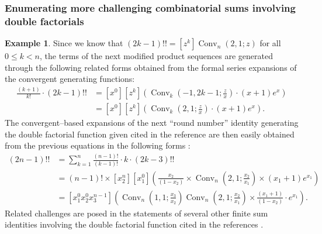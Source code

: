 \documentclass[12pt,reqno]{article}
\numberwithin{sfootnote}{section}
\numberwithin{equation}{section}
\theoremstyle{plain}
\theoremstyle{definition}
\newtheorem{example}[theorem]{Example}
\theoremstyle{remark}
\newcommand{\quotetext}[1]{``#1''}
\newcommand{\ConvGF}[4]{\ensuremath{\Conv_{#1}\left(#2, #3; #4\right)}}
\DeclareMathOperator{\Conv}{Conv}
\begin{document}
\subsubsection{Enumerating more challenging combinatorial sums involving 
               double factorials} 

\begin{example} 
\label{example_SumsInvolving_DblFactFns-exps_examples_v1} 
Since we know that $(2k-1)!! = [z^k] \ConvGF{n}{2}{1}{z}$ 
for all $0 \leq k < n$, the terms of the next 
modified product sequences are generated through the 
following related forms obtained from the formal series 
expansions of the convergent generating functions: 
\begin{align*} 
\frac{(k+1)}{k!} \cdot (2k-1)!! & = 
     [x^0] [z^k] \left( 
     \ConvGF{k}{-1}{2k-1}{\frac{z}{x}} \cdot (x+1) e^{x} 
     \right) \\ 
     & = 
     [x^0] [z^k] \left( 
     \ConvGF{k}{2}{1}{\frac{z}{x}} \cdot (x+1) e^{x} 
     \right). 
\end{align*} 
The convergent--based expansions of the next \quotetext{round number} identity 
generating the double factorial function given cited in the reference 
are then easily obtained from the 
previous equations in the following forms 
\citep[\S 4.3]{DBLFACTFN-COMBIDENTS-SURVEY}: 
\begin{align*} 
(2n-1)!! & = 
     \sum_{k=1}^{n} \frac{(n-1)!}{(k-1)!} \cdot k \cdot (2k-3)!! \\ 
     & = 
     (n-1)! \times [x_2^{n}] [x_1^0] \left( 
     \frac{x_2}{(1-x_2)} \times \ConvGF{n}{2}{1}{\frac{x_2}{x_1}} \times 
     (x_1+1) e^{x_1} 
     \right) \\ 
     & = 
     [x_1^0 x_2^0 x_3^{n-1}] \left( 
     \ConvGF{n}{1}{1}{\frac{x_3}{x_2}} 
     \ConvGF{n}{2}{1}{\frac{x_2}{x_1}} \times 
     \frac{(x_1+1)}{(1-x_2)} \cdot e^{x_1} 
     \right). 
\end{align*} 
Related challenges are posed in the statements of several other 
finite sum identities involving the double factorial function cited in the 
references \citep{MAA-FUN-WITH-DBLFACT,DBLFACTFN-COMBIDENTS-SURVEY}. 
\end{example} 
\end{document}
